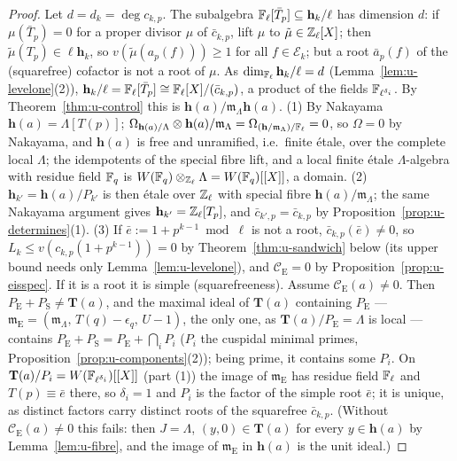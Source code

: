 \documentclass[11pt]{article}
\newcommand{\Iw}{\Lambda}                         %
\newcommand{\hcusp}{\mathbf{h}}                   %
\newcommand{\Tu}{\mathbf{T}}                      %
\newcommand{\Pk}[1]{P_{#1}}                       %
\newcommand{\Eis}{\mathrm{E}}
\newcommand{\cusp}{\mathrm{S}}
\newcommand{\Cg}{\mathcal{C}}                     %
\newcommand{\ee}{\epsilon}                        %
\newcommand{\Ek}{\mathcal{E}}                     %
\newcommand{\Zl}{\Z_\ell}
\begin{document}
\begin{proof}
Let $d=d_k=\deg c_{k,p}$. The subalgebra $\Fl[\bar T_p]\subseteq\hcusp_k/\ell$ has dimension $d$: if $\mu(\bar T_p)=0$ for a proper divisor $\mu$ of
$\bar c_{k,p}$, lift $\mu$ to $\tilde\mu\in\Zl[X]$; then $\tilde\mu(T_p)\in\ell\hcusp_k$, so $v(\tilde\mu(a_p(f)))\ge1$ for all $f\in\Ek_k$; but a root
$\bar a_p(f)$ of the (squarefree) cofactor is not a root of $\mu$. As $\dim_{\Fl}\hcusp_k/\ell=d$ (Lemma~\ref{lem:u-levelone}(2)),
$\hcusp_k/\ell=\Fl[\bar T_p]\cong\Fl[X]/(\bar c_{k,p})$, a product of the fields $\mathbb{F}_{\ell^{\delta_i}}$. By Theorem~\ref{thm:u-control} this is
$\hcusp(a)/\mathfrak m_\Iw\hcusp(a)$. (1) By Nakayama $\hcusp(a)=\Iw[T(p)]$; $\Omega_{\hcusp(a)/\Iw}\otimes\hcusp(a)/\mathfrak m_\Iw=\Omega_{(\hcusp/\mathfrak
m_\Iw)/\Fl}=0$, so $\Omega=0$ by Nakayama, and $\hcusp(a)$ is free and unramified, i.e.\ finite étale, over the complete local $\Iw$; the idempotents of
the special fibre lift, and a local finite étale $\Iw$-algebra with residue field $\mathbb{F}_q$ is $W(\F_q)\otimes_{\Zl}\Iw=W(\F_q)[[X]]$, a domain.
(2) $\hcusp_{k'}=\hcusp(a)/\Pk{k'}$ is then étale over $\Zl$ with special fibre $\hcusp(a)/\mathfrak m_\Iw$; the same Nakayama argument gives
$\hcusp_{k'}=\Zl[T_p]$, and $\bar c_{k',p}=\bar c_{k,p}$ by Proposition~\ref{prop:u-determines}(1). (3) If $\bar e:=1+p^{k-1}\bmod\ell$ is not a root,
$\bar c_{k,p}(\bar e)\ne0$, so $L_k\le v(c_{k,p}(1+p^{k-1}))=0$ by Theorem~\ref{thm:u-sandwich} below (its upper bound needs only
Lemma~\ref{lem:u-levelone}), and $\Cg_\Eis=0$ by Proposition~\ref{prop:u-eisspec}. If it is a root it is simple (squarefreeness). Assume $\Cg_\Eis(a)\ne0$. Then $P_\Eis+P_\cusp\ne\Tu(a)$, and the maximal ideal of $\Tu(a)$
containing $P_\Eis$ --- $\mathfrak m_\Eis=(\mathfrak m_\Iw,\,T(q)-\ee_q,\,U-1)$, the only one, as $\Tu(a)/P_\Eis=\Iw$ is local --- contains
$P_\Eis+P_\cusp=P_\Eis+\bigcap_iP_i$ ($P_i$ the cuspidal minimal primes, Proposition~\ref{prop:u-components}(2)); being prime, it contains some $P_i$.
On $\Tu(a)/P_i=W(\F_{\ell^{\delta_i}})[[X]]$ (part (1)) the image of $\mathfrak m_\Eis$ has residue field $\mathbb{F}_\ell$ and $T(p)\equiv\bar e$ there, so $\delta_i=1$ and
$P_i$ is the factor of the simple root $\bar e$; it is unique, as distinct factors carry distinct roots of the squarefree $\bar c_{k,p}$.
(Without $\Cg_\Eis(a)\ne0$ this fails: then $J=\Iw$, $(y,0)\in\Tu(a)$ for every $y\in\hcusp(a)$ by Lemma~\ref{lem:u-fibre}, and the image of
$\mathfrak m_\Eis$ in $\hcusp(a)$ is the unit ideal.)
\end{proof}
\end{document}
